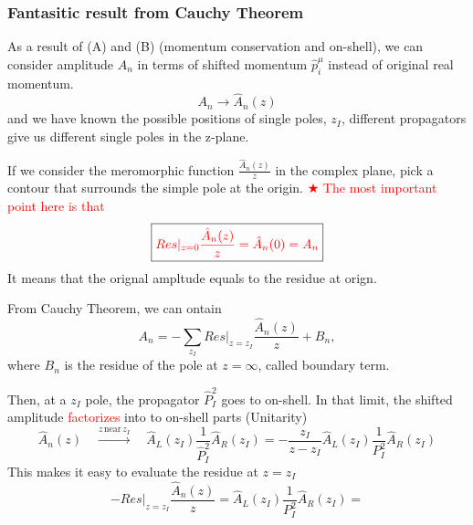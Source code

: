 \documentclass{beamer}
\begin{document}
\begin{frame}
    \frametitle{Fantasitic result from Cauchy Theorem}
    As a result of (A) and (B) (momentum conservation and on-shell), we can consider amplitude $A_n$ in terms of shifted momentum $\hat{p}_i^\mu$ instead of
    original real momentum. 
    \begin{equation*}
        A_n \longrightarrow \hat{A}_n(z)
    \end{equation*}
    and we have known the possible positions of single poles, $z_I$, different propagators give 
    us different single poles in the z-plane. 
    \par
    If we consider the meromorphic function $\frac{\hat{A}_n(z)}{z}$ in the complex plane, pick a contour that surrounds the simple pole at the origin. 
    \textcolor{red}{$\bigstar$ The most important point here is that}
    \begin{equation*}
        \boxed{\color{red}Res|_{z=0}\frac{\hat{A}_n(z)}{z}=\hat{A}_n(0)=A_n}
    \end{equation*}
    It means that the orignal ampltude equals to the residue at orign.
\end{frame}
\begin{frame}
    From Cauchy Theorem, we can ontain
    \begin{equation*}
        A_n=-\sum_{z_I}Res|_{z=z_I}\frac{\hat{A}_n(z)}{z}+B_n,
    \end{equation*}
    where $B_n$ is the residue of the pole at $z=\infty$, called boundary term.

    Then, at a $z_I$ pole, the propagator $\hat{P}_I^2$ goes to on-shell. In that limit, the shifted amplitude
    \textcolor{red}{factorizes} into to on-shell parts (Unitarity)
    \begin{equation*}
        \hat{A}_n(z)\quad \xrightarrow{z\,\text{near}\,z_I} \quad \hat{A}_L(z_I)\frac{1}{\hat{P}_I^2}\hat{A}_R(z_I)= - \frac{z_I}{z-z_I}\hat{A}_L(z_I)\frac{1}{P_I^2}\hat{A}_R(z_I)
    \end{equation*}
    This makes it easy to evaluate the residue at $z=z_I$
    \begin{equation*}
        -Res|_{z=z_I}\frac{\hat{A}_n(z)}{z}=\hat{A}_L(z_I)\frac{1}{P_I^2}\hat{A}_R(z_I)=
    \end{equation*}
\end{frame}
\end{document}
